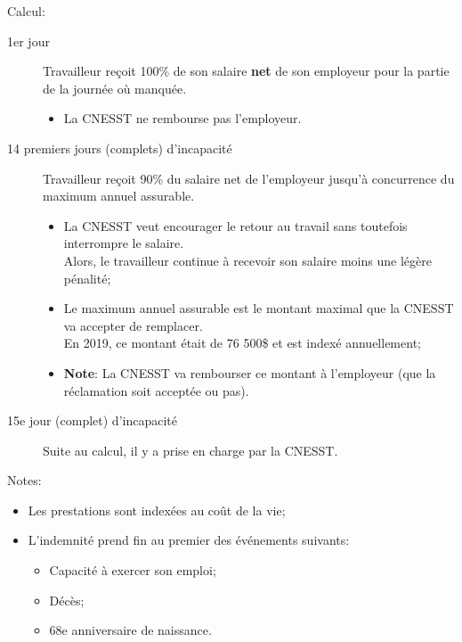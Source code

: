 \documentclass[10pt, french]{article}
\begin{document}
\begin{multicols*}{3}
\begin{definitionNOHFILL}
Calcul:
\begin{description}
	\item[1er jour]	Travailleur reçoit 100\% de son salaire \textbf{net} de son employeur pour la partie de la journée où manquée.
		\begin{itemize}[leftmargin = *]
		\item	La CNESST ne rembourse pas l'employeur.
		\end{itemize}
	\item[14 premiers jours (complets) d'incapacité]	Travailleur reçoit 90\% du salaire net de l'employeur jusqu'à concurrence du maximum annuel assurable.
		\begin{itemize}[leftmargin = *]
		\item	La CNESST veut encourager le retour au travail sans toutefois interrompre le salaire.\\
				Alors, le travailleur continue à recevoir son salaire moins une légère pénalité;
		\item	Le maximum annuel assurable est le montant maximal que la CNESST va accepter de remplacer.\\
				En 2019, ce montant était de 76 500\$ et est indexé annuellement;
		\item	\textbf{Note}: La CNESST va rembourser ce montant à l'employeur (que la réclamation soit acceptée ou pas).
		\end{itemize}
	\item[15e jour (complet) d'incapacité]	Suite au calcul, il y a prise en charge par la CNESST.
\end{description}

\tcbline

Notes:
\begin{itemize}[leftmargin = *]
	\item	Les prestations sont indexées au coût de la vie;
	\item	L'indemnité prend fin au premier des événements suivants:
		\begin{itemize}[leftmargin = *]
		\item	Capacité à exercer son emploi;
		\item	Décès;
		\item	68e anniversaire de naissance.
		\end{itemize}
\end{itemize}
\end{definitionNOHFILL}


\end{multicols*}
\end{document}
